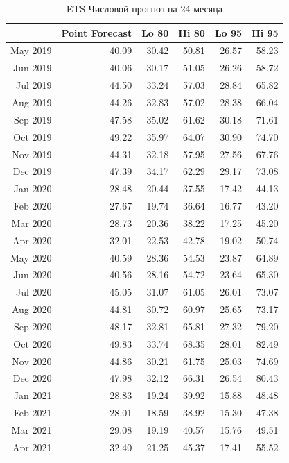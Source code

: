\documentclass[14pt, a4paper]{extarticle}\usepackage[]{graphicx}\usepackage[]{color}
\begin{document}
\begin{table}[ht]
\centering
\begin{tabular}{rrrrrr}
  \hline
 & Point Forecast & Lo 80 & Hi 80 & Lo 95 & Hi 95 \\ 
  \hline
May 2019 & 40.09 & 30.42 & 50.81 & 26.57 & 58.23 \\ 
  Jun 2019 & 40.06 & 30.17 & 51.05 & 26.26 & 58.72 \\ 
  Jul 2019 & 44.50 & 33.24 & 57.03 & 28.84 & 65.82 \\ 
  Aug 2019 & 44.26 & 32.83 & 57.02 & 28.38 & 66.04 \\ 
  Sep 2019 & 47.58 & 35.02 & 61.62 & 30.18 & 71.61 \\ 
  Oct 2019 & 49.22 & 35.97 & 64.07 & 30.90 & 74.70 \\ 
  Nov 2019 & 44.31 & 32.18 & 57.95 & 27.56 & 67.76 \\ 
  Dec 2019 & 47.39 & 34.17 & 62.29 & 29.17 & 73.08 \\ 
  Jan 2020 & 28.48 & 20.44 & 37.55 & 17.42 & 44.13 \\ 
  Feb 2020 & 27.67 & 19.74 & 36.64 & 16.77 & 43.20 \\ 
  Mar 2020 & 28.73 & 20.36 & 38.22 & 17.25 & 45.20 \\ 
  Apr 2020 & 32.01 & 22.53 & 42.78 & 19.02 & 50.74 \\ 
  May 2020 & 40.59 & 28.36 & 54.53 & 23.87 & 64.89 \\ 
  Jun 2020 & 40.56 & 28.16 & 54.72 & 23.64 & 65.30 \\ 
  Jul 2020 & 45.05 & 31.07 & 61.05 & 26.01 & 73.07 \\ 
  Aug 2020 & 44.81 & 30.72 & 60.97 & 25.65 & 73.17 \\ 
  Sep 2020 & 48.17 & 32.81 & 65.81 & 27.32 & 79.20 \\ 
  Oct 2020 & 49.83 & 33.74 & 68.35 & 28.01 & 82.49 \\ 
  Nov 2020 & 44.86 & 30.21 & 61.75 & 25.03 & 74.69 \\ 
  Dec 2020 & 47.98 & 32.12 & 66.31 & 26.54 & 80.43 \\ 
  Jan 2021 & 28.83 & 19.24 & 39.92 & 15.88 & 48.48 \\ 
  Feb 2021 & 28.01 & 18.59 & 38.92 & 15.30 & 47.38 \\ 
  Mar 2021 & 29.08 & 19.19 & 40.57 & 15.76 & 49.51 \\ 
  Apr 2021 & 32.40 & 21.25 & 45.37 & 17.41 & 55.52 \\ 
   \hline
\end{tabular}
\caption{ETS Числовой прогноз на 24 месяца} 
\end{table}
\end{document}
